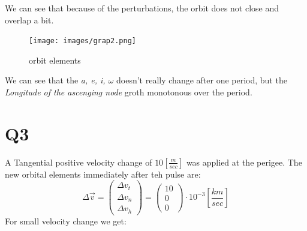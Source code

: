 \documentclass[11pt, a4paper]{article}
\begin{document}
\noindent We can see that because of the perturbations, the orbit does not close and overlap a bit.
\begin{figure}[H]
    \begin{center}
    \texttt{[image: images/grap2.png]}
    \caption{orbit elements}
    \end{center}
\end{figure}
We can see that the \emph{a, e, i, $\omega$} doesn't really change after one period, but the \emph{Longitude of the ascenging node} groth monotonous over the period.
\newpage

\section{Q3}
A Tangential positive velocity change of $10\left[\frac{m}{sec}\right]$ was applied at the perigee. The new orbital elements immediately after teh pulse are:
\begin{equation}
    \Delta\vec{v} = \begin{pmatrix}
        \Delta v_t \\
        \Delta v_n \\
        \Delta v_h
    \end{pmatrix}
    =
    \begin{pmatrix}
        10 \\ 0 \\ 0
    \end{pmatrix}
    \cdot 10^{-3} \left[\frac{km}{sec}\right]
\end{equation}
For small velocity change we get:
\end{document}
